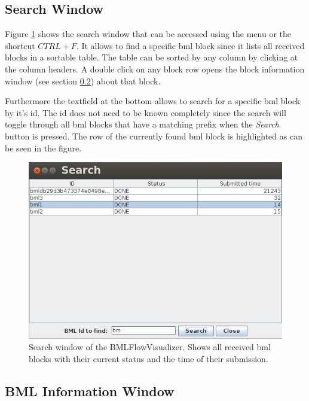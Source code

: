 \documentclass[12pt,a4paper]{article}
\begin{document}
\clearpage
\subsection{Search Window} \label{sec:search}

Figure \ref{fig:search} shows the search window that can be accessed using the menu or the shortcut $CTRL+F$. It allows to find a specific bml block since it lists all received blocks in a sortable table. The table can be sorted by any column by clicking at the column headers. A double click on any block row opens the block information window (see section \ref{sec:bmlinfo}) about that block.

Furthermore the textfield at the bottom allows to search for a specific bml block by it's id. The id does not need to be known completely since the search will toggle through all bml blocks that have a matching prefix when the \textit{Search} button is pressed. The row of the currently found bml block is highlighted as can be seen in the figure.

\begin{figure}[!htb]
\centering
 \includegraphics[width=\textwidth]{images/bmlFlowSearch.png}
 \caption{Search window of the BMLFlowVisualizer. Shows all received bml blocks with their current status and the time of their submission.}
 \label{fig:search}
\end{figure}

\subsection{BML Information Window} \label{sec:bmlinfo}
\end{document}
